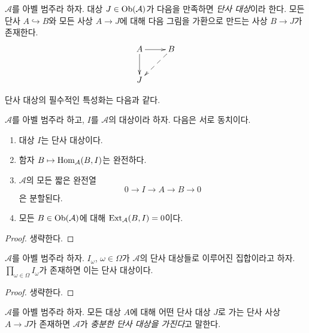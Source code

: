 \begin{definition}
\label{definition-injective}
$\mathcal{A}$를 아벨 범주라 하자. 대상 $J \in \mathop{\mathrm{Ob}}\nolimits(\mathcal{A})$가
다음을 만족하면 {\it 단사 대상}이라 한다. 모든 단사
$A \hookrightarrow B$와 모든 사상 $A \to J$에 대해 다음 그림을
가환으로 만드는 사상 $B \to J$가 존재한다.
$$
\xymatrix{
A \ar[r] \ar[d] & B \ar@{-->}[ld] \\
J &
}
$$
\end{definition}

\noindent
단사 대상의 필수적인 특성화는 다음과 같다.

\begin{lemma}
\label{lemma-characterize-injectives}
$\mathcal{A}$를 아벨 범주라 하고, $I$를 $\mathcal{A}$의 대상이라 하자.
다음은 서로 동치이다.
\begin{enumerate}
\item 대상 $I$는 단사 대상이다.
\item 함자 $B \mapsto \mathop{\mathrm{Hom}}\nolimits_\mathcal{A}(B, I)$는 완전하다.
\item $\mathcal{A}$의 모든 짧은 완전열
$$
0 \to I \to A \to B \to 0
$$
은 분할된다.
\item 모든 $B \in \mathop{\mathrm{Ob}}\nolimits(\mathcal{A})$에 대해
$\mathop{\mathrm{Ext}}\nolimits_\mathcal{A}(B, I) = 0$이다.
\end{enumerate}
\end{lemma}

\begin{proof}
생략한다.
\end{proof}

\begin{lemma}
\label{lemma-product-injectives}
$\mathcal{A}$를 아벨 범주라 하자. $I_\omega$, $\omega \in \Omega$가
$\mathcal{A}$의 단사 대상들로 이루어진 집합이라고 하자.
$\prod_{\omega \in \Omega} I_\omega$가 존재하면 이는 단사 대상이다.
\end{lemma}

\begin{proof}
생략한다.
\end{proof}

\begin{definition}
\label{definition-enough-injectives}
$\mathcal{A}$를 아벨 범주라 하자. 모든 대상 $A$에 대해 어떤 단사 대상
$J$로 가는 단사 사상 $A \to J$가 존재하면 $\mathcal{A}$가
{\it 충분한 단사 대상을 가진다}고 말한다.
\end{definition}


